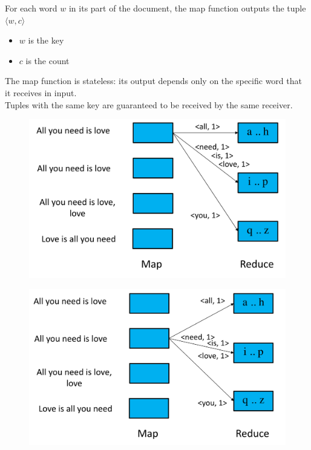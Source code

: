 \documentclass[10pt,a4paper]{article}
\begin{document}
For each word $w$ in its part of the document, the map function outputs the tuple $\langle w,c \rangle$
\begin{itemize}
	\item $w$ is the key
	\item $c$ is the count
\end{itemize}
The map function is stateless: its output depends only on the specific word that it receives in input. \\
Tuples with the same key are guaranteed to be received by the same receiver.
\begin{figure}[h!]
\centering
\begin{minipage}{.5\textwidth}
  \centering
  \includegraphics[width=.6\linewidth]{images/map-example2.png}
  \label{fig:map-example2}
\end{minipage}%
\begin{minipage}{.5\textwidth}
  \centering
  \includegraphics[width=.6\linewidth]{images/map-example3.png}
  \label{fig:map-example3}
\end{minipage}
\end{figure} 
\end{document}
